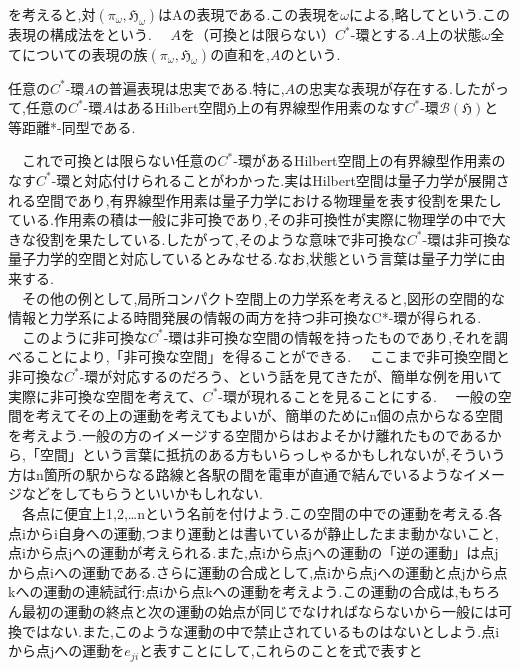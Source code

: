 を考えると,対$\left(\pi_{\omega},\mathfrak{H}_{\omega}\right)$はAの表現である.この表現を$\omega$による,略してという.この表現の構成法をという.
　$A$を（可換とは限らない）$C^*$-環とする.$A$上の状態$\omega$全てについての表現の族$\left(\pi_{\omega},\mathfrak{H}_{\omega}\right)$の直和を,$A$のという.
\begin{theo}
任意の$C^*$-環$A$の普遍表現は忠実である.特に,$A$の忠実な表現が存在する.したがって,任意の$C^*$-環$A$はある{\rm Hilbert}空間$\mathfrak{H}$上の有界線型作用素のなす$C^*$-環$\mathcal{B}\left(\mathfrak{H}\right)$と等距離*-同型である.
\end{theo}
　これで可換とは限らない任意の$C^*$-環があるHilbert空間上の有界線型作用素のなす$C^*$-環と対応付けられることがわかった.実はHilbert空間は量子力学が展開される空間であり,有界線型作用素は量子力学における物理量を表す役割を果たしている.作用素の積は一般に非可換であり,その非可換性が実際に物理学の中で大きな役割を果たしている.したがって,そのような意味で非可換な$C^*$-環は非可換な量子力学的空間と対応しているとみなせる.なお,状態という言葉は量子力学に由来する.\\
　その他の例として,局所コンパクト空間上の力学系を考えると,図形の空間的な情報と力学系による時間発展の情報の両方を持つ非可換なC*-環が得られる.\\
　このように非可換な$C^*$-環は非可換な空間の情報を持ったものであり,それを調べることにより,「非可換な空間」を得ることができる.
　ここまで非可換空間と非可換な$C^*$-環が対応するのだろう、という話を見てきたが、簡単な例を用いて実際に非可換な空間を考えて、$C^*$-環が現れることを見ることにする.
　一般の空間を考えてその上の運動を考えてもよいが、簡単のためにn個の点からなる空間を考えよう.一般の方のイメージする空間からはおよそかけ離れたものであるから,「空間」という言葉に抵抗のある方もいらっしゃるかもしれないが,そういう方はn箇所の駅からなる路線と各駅の間を電車が直通で結んでいるようなイメージなどをしてもらうといいかもしれない.\\
　各点に便宜上1,2,…nという名前を付けよう.この空間の中での運動を考える.各点iからi自身への運動,つまり運動とは書いているが静止したまま動かないこと,点iから点jへの運動が考えられる.また,点iから点jへの運動の「逆の運動」は点jから点iへの運動である.さらに運動の合成として,点iから点jへの運動と点jから点kへの運動の連続試行:点iから点kへの運動を考えよう.この運動の合成は,もちろん最初の運動の終点と次の運動の始点が同じでなければならないから一般には可換ではない.また,このような運動の中で禁止されているものはないとしよう.点iから点jへの運動を$e_{ji}$と表すことにして,これらのことを式で表すと
